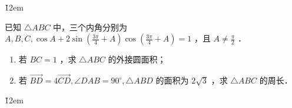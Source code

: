 \v{12em}

\begin{example}
    已知 $\triangle A B C$ 中，三个内角分别为 $A, B, C, \cos A+2 \sin \left(\frac{3 \pi}{4}+A\right) \cos \left(\frac{3 \pi}{4}+A\right)=1$ ，且 $A \neq \frac{\pi}{2}$ ．
    \begin{enumerate}
        \item 若 $B C=1$ ，求 $\triangle A B C$ 的外接圆面积；
        \item 若 $\overrightarrow{B D}=4 \overrightarrow{C D}, \angle D A B=90^{\circ}, \triangle A B D$ 的面积为 $2 \sqrt{3}$ ，求 $\triangle A B C$ 的周长．
    \end{enumerate}
\end{example}

\v{12em}
